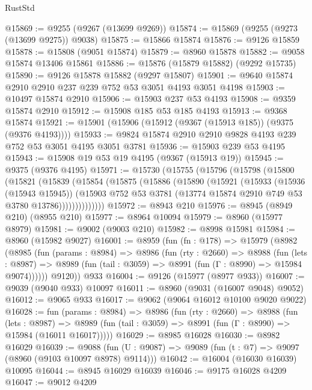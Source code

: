\begin{lexlean}{RustStd}
\begin{coremodule}
@15869 := @9255 (@9267 (@13699 @9269))
@15874 := @15869 (@9255 (@9273 (@13699 @9275)) @9038)
@15875 := @15866 @15874
@15876 := @9126 @15859
@15878 := @15808 (@9051 @15874)
@15879 := @8960 @15878
@15882 := @9058 @15874 @13406 @15861
@15886 := @15876 (@15879 @15882) (@9292 @15735)
@15890 := @9126 @15878 @15882 (@9297 @15807)
@15901 := @9640 @15874 @2910 @2910 @237 @239 @752 @53 @3051 @4193 @3051 @4198
@15903 := @10497 @15874 @2910
@15906 := @15903 @237 @53 @4193
@15908 := @9359 @15874 @2910
@15912 := @15908 @185 @53 @185 @4193
@15913 := @9368 @15874
@15921 := @15901 (@15906 (@15912 (@9367 (@15913 @185)) (@9375 (@9376 @4193))))
@15933 := @9824 @15874 @2910 @2910 @9828 @4193 @239 @752 @53 @3051 @4195 @3051 @3781
@15936 := @15903 @239 @53 @4195
@15943 := @15908 @19 @53 @19 @4195 (@9367 (@15913 @19))
@15945 := @9375 (@9376 @4195)
@15971 := @15730
    (@15755
      (@15796
        (@15798
          (@15800
            (@15821
              (@15839
                (@15854
                  (@15875
                    (@15886
                      (@15890
                        (@15921
                          (@15933
                            (@15936 (@15943 @15945))
                            (@15903
                              @752
                              @53
                              @3781
                              (@13774 @15874 @2910 @749 @53 @3780 @13786))))))))))))))
@15972 := @8943 @210
@15976 := @8945 (@8949 @210) (@8955 @210)
@15977 := @8964 @10094
@15979 := @8960 (@15977 @8979)
@15981 := @9002 (@9003 @210)
@15982 := @8998 @15981
@15984 := @8960 (@15982 @9027)
@16001 := @8959
    (fun (fn : @178) =>
    @15979
      (@8982
        (@8985
          (fun (params : @8984) =>
          @8986
            (fun (rty : @2660) =>
            @8988
              (fun (lets : @8987) =>
              @8989 (fun (tail : @3059) => @8991 (fun (Γ : @8990) => @15984 @9074))))))
        @9120))
    @933
@16004 := @9126 (@15977 (@8977 @933))
@16007 := @9039 (@9040 @933) @10097
@16011 := @8960 (@9031 (@16007 @9048) @9052)
@16012 := @9065 @933
@16017 := @9062 (@9064 @16012 @10100 @9020 @9022)
@16028 := fun (params : @8984) =>
  @8986
    (fun (rty : @2660) =>
    @8988
      (fun (lets : @8987) =>
      @8989 (fun (tail : @3059) => @8991 (fun (Γ : @8990) => @15984 (@16011 @16017)))))
@16029 := @8985 @16028
@16030 := @8982 @16029
@16039 := @9088
    (fun (U : @9087) => @9089 (fun (t : @7) => @9097 (@8960 (@9103 @10097 @8978) @9114)))
@16042 := @16004 (@16030 @16039) @10095
@16044 := @8945 @16029 @16039
@16046 := @9175 @16028 @4209
@16047 := @9012 @4209

\end{coremodule}
\end{lexlean}
